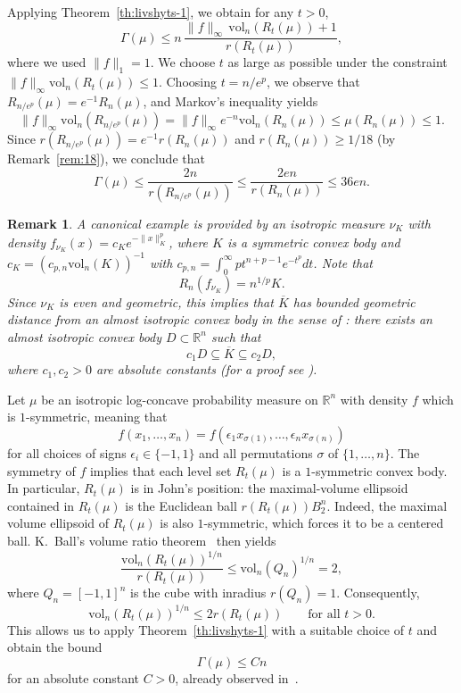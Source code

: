 \documentclass[11pt,leqno]{article}
\newtheorem{remark}[theorem]{Remark}
\theoremstyle{remark}
\numberwithin{equation}{section}
\newcommand{\vol}{\mathrm{vol}}
\newcommand{\ls}{\leqslant}
\newcommand{\gr}{\geqslant}
\begin{document}
Applying Theorem~\ref{th:livshyts-1}, we obtain for any $t>0$,
$$\Gamma(\mu)\ls n\,\frac{\|f\|_{\infty}\,\vol_n(R_t(\mu))+1}{r(R_t(\mu))},$$
where we used $\|f\|_1=1$.
We choose $t$ as large as possible under the constraint $\|f\|_{\infty}\vol_n(R_t(\mu))\ls 1$. 
Choosing $t=n/e^p$, we observe that $R_{n/e^p}(\mu)=e^{-1}R_n(\mu)$, and Markov's inequality yields
$$\|f\|_{\infty}\vol_n(R_{n/e^p}(\mu))=\|f\|_{\infty}e^{-n} \vol_n(R_n(\mu)) \ls \mu(R_n(\mu))\ls 1.$$
Since $r(R_{n/e^p}(\mu))=e^{-1}r(R_n(\mu))$ and $r(R_n(\mu))\gr 1/18$ (by Remark~\ref{rem:18}), we conclude that 
$$\Gamma(\mu)\ls \frac{2n}{r(R_{n/e^p}(\mu))}\ls \frac{2en}{r(R_n(\mu))}\ls 36en.$$


\begin{remark}\rm A canonical example is provided by an isotropic measure $\nu_K$ with density
$f_{\nu_K}(x)=c_K e^{-\|x\|_K^p}$, where $K$ is a symmetric convex body and $c_K=(c_{p,n}\vol_n(K))^{-1}$ 
with $c_{p,n}=\int_0^{\infty}pt^{n+p-1}e^{-t^p}dt$. Note that
$$R_n(f_{\nu_K})=n^{1/p}K.$$
Since $\nu_K$ is even and geometric, this implies that $\overline{K}$ has bounded geometric distance from an almost isotropic convex body
in the sense of \cite[Definition~2.5.11]{BGVV-book}: there exists
an almost isotropic convex body $D\subset \mathbb{R}^n$ such that
$$c_1D\subseteq \overline{K}\subseteq c_2D,$$
where $c_1,c_2>0$ are absolute constants (for a proof see \cite[Lemma~3.3]{Giannopoulos-Tziotziou-2025b}).
\end{remark}

\medskip 

Let $\mu$ be an isotropic log-concave probability measure on $\mathbb{R}^n$ with density $f$ which is $1$-symmetric, meaning that 
$$f(x_1,\ldots,x_n)=f(\epsilon_1 x_{\sigma(1)},\ldots,\epsilon_n x_{\sigma(n)})$$ for all choices of signs $\epsilon_i\in\{-1,1\}$ and all permutations $\sigma$ of $\{1,\ldots,n\}$. 
The symmetry of $f$ implies that each level set $R_t(\mu)$ is a $1$-symmetric convex body.
In particular, $R_t(\mu)$ is in John's position: the maximal-volume ellipsoid contained in $R_t(\mu)$ is the Euclidean ball $r(R_t(\mu))B_2^n$. 
Indeed, the maximal volume ellipsoid of $R_t(\mu)$ is also $1$-symmetric, which forces it to be a centered ball.
K.~Ball's volume ratio theorem~\cite{Ball-1989} then yields
$$\frac{\vol_n(R_t(\mu))^{1/n}}{r(R_t(\mu))}\ls \vol_n(Q_n)^{1/n}=2,$$
where $Q_n=[-1,1]^n$ is the cube with inradius $r(Q_n)=1$.
Consequently,
$$\vol_n(R_t(\mu))^{1/n}\ls 2r(R_t(\mu)) \qquad \text{for all } t>0.$$
This allows us to apply Theorem~\ref{th:livshyts-1} with a suitable choice of $t$ and obtain the bound
$$\Gamma(\mu)\ls Cn$$
for an absolute constant $C>0$, already observed in~\cite{Livshyts-2021}.
\end{document}
